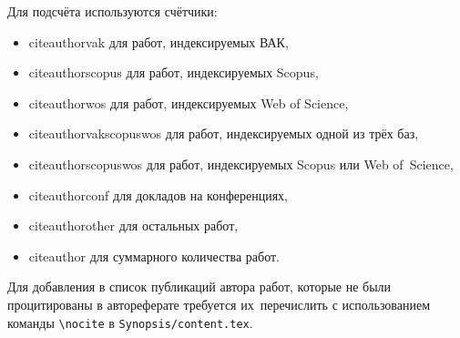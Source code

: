 Для подсчёта используются счётчики:
\begin{itemize}
        \item {citeauthorvak} для работ, индексируемых ВАК,
        \item {citeauthorscopus} для работ, индексируемых Scopus,
        \item {citeauthorwos} для работ, индексируемых Web of Science,
        \item {citeauthorvakscopuswos} для работ, индексируемых одной из трёх баз,
        \item {citeauthorscopuswos} для работ, индексируемых Scopus или Web of~Science,
        \item {citeauthorconf} для докладов на конференциях,
        \item {citeauthorother} для остальных работ,
        \item {citeauthor} для суммарного количества работ.
\end{itemize}

Для добавления в список публикаций автора работ, которые не были процитированы в
автореферате требуется их~перечислить с использованием команды \verb!\nocite! в
\verb!Synopsis/content.tex!.
\fi

